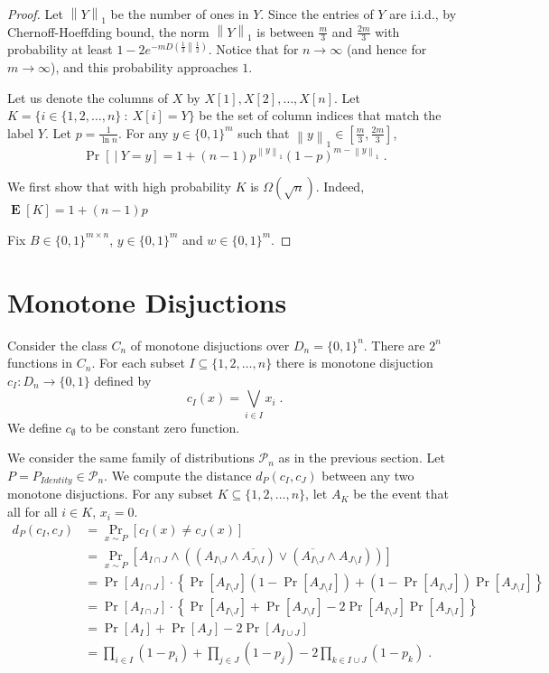 \documentclass[10pt]{article}
\renewcommand{\P}{\mathcal{P}}
\newcommand{\KL}[2]{D\left(#1 \middle\| #2 \right)}
\newcommand{\norm}[1]{\left\| #1 \right\|}
\DeclareMathOperator{\Exp}{\mathbf{E}}
\begin{document}
\begin{proof}
Let $\norm{Y}_1$ be the number of ones in $Y$. Since the entries of $Y$ are
i.i.d., by Chernoff-Hoeffding bound, the norm $\norm{Y}_1$ is between
$\frac{m}{3}$ and $\frac{2m}{3}$ with probability at least $1 - 2e^{-m
\KL{\frac{1}{3}}{\frac{1}{2}}}$. Notice that for $n \to \infty$ (and hence for
$m \to \infty$), and this probability approaches $1$.

Let us denote the columns of $X$ by $X[1], X[2], \dots, X[n]$.
Let $K = \{ i \in \{1,2,\dots,n\} ~:~ X[i] = Y \}$ be the set of column indices that match the label $Y$.
Let $p = \frac{1}{\ln n}$. For any $y \in \{0,1\}^m$ such that $\norm{y}_1 \in [\frac{m}{3}, \frac{2m}{3}]$,
$$
\Pr \left[  ~|~ Y = y \right] = 1 + (n-1) p^{\norm{y}_1} (1 - p)^{m - \norm{y}_1} \; .
$$


We first show that with high probability $K$ is $\Omega(\sqrt{n})$. Indeed, $\Exp[K] = 1 + (n-1)p$

Fix $B \in \{0,1\}^{m \times n}$, $y \in \{0,1\}^m$ and $w \in \{0,1\}^m$.

\end{proof}


\section{Monotone Disjuctions}

Consider the class $C_n$ of monotone disjuctions over $D_n = \{0,1\}^n$.
There are $2^n$ functions in $C_n$. For each subset $I \subseteq \{1,2,\dots,n\}$
there is monotone disjuction $c_I:D_n \to \{0,1\}$ defined by
$$
c_I(x) = \bigvee_{i \in I} x_i \; .
$$
We define $c_\emptyset$ to be constant zero function.

We consider the same family of distributions $\P_n$ as in the previous section.
Let $P = P_{Identity} \in \P_n$. We compute the distance $d_P(c_I, c_J)$
between any two monotone disjuctions. For any subset
$K \subseteq \{1,2,\dots,n\}$, let $A_K$ be the event that all for all $i \in K$, $x_i = 0$.
\begin{align*}
d_P(c_I, c_J)
& = \Pr_{x \sim P}[c_I(x) \neq c_J(x)] \\
& = \Pr_{x \sim P}[A_{I \cap J} \wedge ((A_{I \setminus J} \wedge \overline{A_{J \setminus I}}) \vee (\overline{A_{I \setminus J}} \wedge A_{J \setminus I} )) ] \\
& = \Pr[A_{I \cap J}] \cdot \left\{ \Pr[A_{I \setminus J}] (1 - \Pr[A_{J \setminus I}]) + (1 - \Pr[A_{I \setminus J}]) \Pr[A_{J \setminus I}] \right\} \\
& = \Pr[A_{I \cap J}] \cdot \left\{ \Pr[A_{I \setminus J}] + \Pr[A_{J \setminus I}] - 2 \Pr[A_{I \setminus J}] \Pr[A_{J \setminus I}] \right\} \\
& = \Pr[A_I] + \Pr[A_J] - 2 \Pr[A_{I \cup J}] \\
& = \prod_{i \in I} (1 - p_i) + \prod_{j \in J} (1 - p_j) - 2 \prod_{k \in I \cup J} (1 - p_k) \; . \\
\end{align*}



\end{document}
